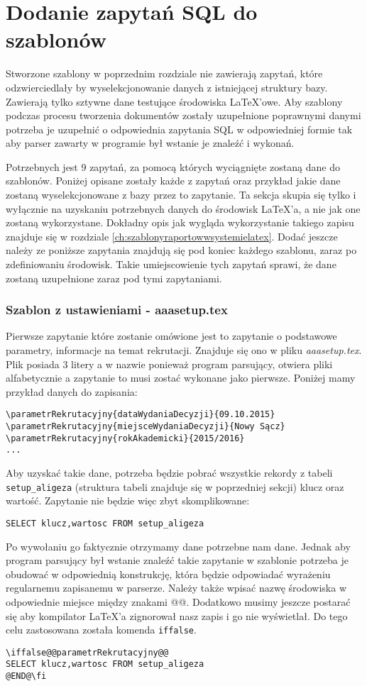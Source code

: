 \section{Dodanie zapytań SQL do szablonów}

Stworzone szablony w poprzednim rozdziale nie zawierają zapytań, które odzwierciedlały by wyselekcjonowanie danych z istniejącej struktury bazy. Zawierają tylko sztywne dane testujące środowiska LaTeX'owe. Aby szablony podczas procesu tworzenia dokumentów zostały uzupełnione poprawnymi danymi potrzeba je uzupełnić o odpowiednia zapytania SQL w odpowiedniej formie tak aby parser zawarty w programie był wstanie je znaleźć i wykonań.
\par 
Potrzebnych jest 9 zapytań, za pomocą których wyciągnięte zostaną dane do szablonów. Poniżej opisane zostały każde z zapytań oraz przykład jakie dane zostaną wyselekcjonowane z bazy przez to zapytanie. Ta sekcja skupia się tylko i wyłącznie na uzyskaniu potrzebnych danych do środowisk LaTeX'a, a nie jak one zostaną wykorzystane. Dokładny opis jak wygląda wykorzystanie takiego zapisu znajduje się w rozdziale \ref{ch:szablonyraportowwsystemielatex}. Dodać jeszcze należy ze poniższe zapytania znajdują się pod koniec każdego szablonu, zaraz po zdefiniowaniu środowisk. Takie umiejscowienie tych zapytań sprawi, że dane zostaną uzupełnione zaraz pod tymi zapytaniami.
\par 
\subsubsection*{Szablon z ustawieniami - aaasetup.tex}
Pierwsze zapytanie które zostanie omówione jest to  zapytanie o podstawowe parametry, informacje na temat rekrutacji. Znajduje się ono w pliku \emph{aaasetup.tex}. Plik posiada 3 litery a w nazwie ponieważ program parsujący, otwiera pliki alfabetycznie a zapytanie to musi zostać wykonane jako pierwsze.  Poniżej mamy przykład danych do zapisania:
 \begin{lstlisting}
\parametrRekrutacyjny{dataWydaniaDecyzji}{09.10.2015}
\parametrRekrutacyjny{miejsceWydaniaDecyzji}{Nowy Sącz}
\parametrRekrutacyjny{rokAkademicki}{2015/2016}
...
\end{lstlisting}
Aby uzyskać takie dane, potrzeba będzie pobrać wszystkie rekordy z tabeli \texttt{setup\_aligeza} (struktura tabeli znajduje się w poprzedniej sekcji) klucz oraz wartość. Zapytanie nie będzie więc zbyt skomplikowane:
 \begin{lstlisting}
SELECT klucz,wartosc FROM setup_aligeza
\end{lstlisting}
Po wywołaniu go faktycznie otrzymamy dane potrzebne nam dane. Jednak aby program parsujący był wstanie znaleźć takie zapytanie w szablonie potrzeba je obudować w odpowiednią konstrukcję, która będzie odpowiadać wyrażeniu regularnemu zapisanemu w parserze. Należy także wpisać nazwę środowiska w odpowiednie miejsce między znakami @@. Dodatkowo musimy jeszcze postarać się aby kompilator LaTeX'a zignorował nasz zapis i go nie wyświetlał. Do tego celu zastosowana została komenda \texttt{iffalse}.
 \begin{lstlisting}
\iffalse@@parametrRekrutacyjny@@
SELECT klucz,wartosc FROM setup_aligeza
@END@\fi
\end{lstlisting}
